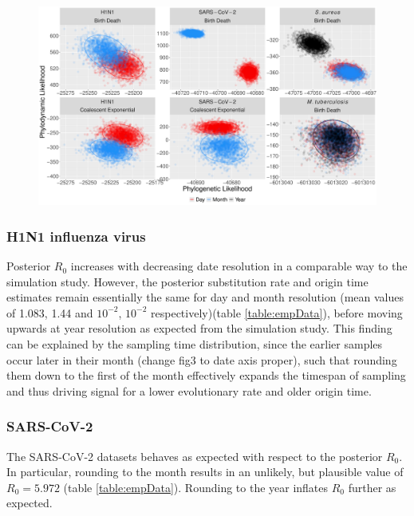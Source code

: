 \documentclass{article}
\begin{document}
\begin{spacing}{1.5}
\begin{figure}
    \centering
    \includegraphics[width=\textwidth]{figures/empirical_likelihood.pdf}
    \caption{}
    \label{fig:emp-likelihood}
\end{figure}

\subsubsection*{H1N1 influenza virus}
Posterior $R_0$ increases with decreasing date resolution in a comparable way to the simulation study. However, the posterior substitution rate and origin time estimates remain essentially the same for day and month resolution (mean values of 1.083, 1.44 and $10^{-2}$, $10^{-2}$ respectively)(table \ref{table:empData}),  before moving upwards at year resolution as expected from the simulation study. This finding can be explained by the sampling time distribution, since the earlier samples occur later in their month (change fig3 to date axis proper), such that rounding them down to the first of the month effectively expands the timespan of sampling and thus driving signal for a lower evolutionary rate and older origin time.

\subsubsection*{SARS-CoV-2}
The SARS-CoV-2 datasets behaves as expected with respect to the posterior $R_0$. In particular, rounding to the month results in an unlikely, but plausible value of $R_0 = 5.972$ (table \ref{table:empData}). Rounding to the year inflates $R_0$ further as expected.


\end{spacing}
\end{document}
